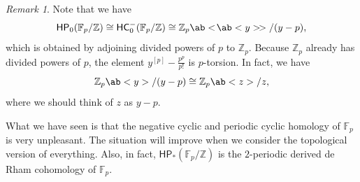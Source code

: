 \documentclass[10pt, oneside]{memoir}
\theoremstyle{definition}
\theoremstyle{remark}
\newtheorem{rmk}[thm]{Remark}
\theoremstyle{plain}
\theoremstyle{definition}
\theoremstyle{remark}
\newcommand{\Z}{\mathbb{Z}}
\newcommand{\F}{\mathbb{F}}
\newcommand{\ms}[1]{\mathsf{#1}}
\newcommand{\1}{\mathbf{1}}
\newcommand{\2}{\mathbf{2}}
\newcommand{\3}{\mathbf{3}}
\newcommand{\dps}[1]{\ab<\!\ab< #1 >\!>}
\newcommand{\HC}{\ms{HC}}
\newcommand{\HP}{\ms{HP}}
\begin{document}
\begin{rmk}
    Note that we have
    \[ \HP_0(\F_p/\Z) \cong \HC_0^-(\F_p/\Z) \cong \Z_p\dps{y}/(y-p), \]
    which is obtained by adjoining divided powers of \(p \) to \(\Z_p \). Because \(\Z_p \) already has divided powers of \(p \), the element \(y^{[p]} - \frac{p^p}{p!} \) is \(p \)-torsion. In fact, we have
    \[ \Z_p \ab<y>/(y-p) \cong \Z_p \ab<z> / z, \]
    where we should think of \(z \) as \(y-p \).

    What we have seen is that the negative cyclic and periodic cyclic homology of \(\F_p \) is very unpleasant. The situation will improve when we consider the topological version of everything. Also, in fact, \(\HP_*(\F_p/\Z) \) is the \(2 \)-periodic derived de Rham cohomology of \(\F_p \).
\end{rmk}
\end{document}
